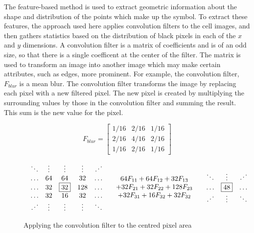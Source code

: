 
The feature-based method is used to extract geometric information about the
shape and distribution of the points which make up the symbol. To extract these
features, the approach used here applies convolution filters to the cell
images, and then gathers statistics based on the distribution of black pixels
in each of the $x$ and $y$ dimensions. A convolution filter is a matrix of
coefficients and is of an odd size, so that there is a single coefficent at
the center of the filter. The matrix is used to transform an image into another
image which may make certain attributes, such as edges, more prominent.  For
example, the convolution filter, $F_{blur}$ is a mean blur. The convolution
filter transforms the image by replacing each pixel with a new filtered pixel.
The new pixel is created by multiplying the surrounding values by those in the
convolution filter and summing the result. This sum is the new value for the
pixel.

\[ F_{blur} = \left[
\begin{array}{ccc}
1/16 & 2/16 & 1/16 \\
2/16 & 4/16 & 2/16 \\
1/16 & 2/16 & 1/16
\end{array}\right]
\]

\begin{figure}[h] \[
\begin{array}{lcr}
\begin{array}{ccccc}
\ddots & \vdots & \vdots & \vdots & \iddots \\
\ldots & 64 & 64 & 32 & \ldots \\
\ldots & 32 & \fbox{32} & 128 & \ldots \\
\ldots & 32 & 16 & 32 & \ldots \\
\iddots & \vdots & \vdots & \vdots & \ddots \\
\end{array} &
\begin{array}{c}
64F_{11} + 64F_{12} + 32F_{13} \\
+ 32F_{21} + 32F_{22} + 128F_{23} \\
+ 32F_{31} + 16F_{32} + 32F_{32} \\
\end{array} &
\begin{array}{ccccc}
\ddots & \vdots & \iddots \\
\ldots &  \fbox{48}  & \ldots \\
\iddots & \vdots & \ddots \\
\end{array}
\end{array} \]
\caption{Applying the convolution filter to the centred pixel area}
\label{figure:convolution}
\end{figure}

